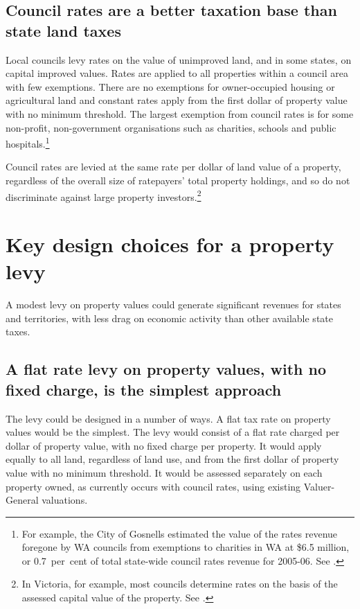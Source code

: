 \documentclass[twoside,english]{palatinob5portrait}
\begin{document}
\section{\label{sec:PROP-5-2}Council rates are a better taxation base than state land taxes}
Local councils levy rates on the value of unimproved land, and in some states, on capital improved values. Rates are applied to all properties within a council area with few exemptions. There are no exemptions for owner-occupied housing or agricultural land and constant rates apply from the first dollar of property value with no minimum threshold. The largest exemption from council rates is for some non-profit, non-government organisations such as charities, schools and public hospitals.\footnote{For example, the City of Gosnells estimated the value of the rates revenue foregone by WA councils from exemptions to charities in WA at \$6.5 million, or 0.7~per~cent of total state-wide council rates revenue for 2005-06. See \textcite[][107]{productivity2008assessing}.}

Council rates are levied at the same rate per dollar of land value of a property, regardless of the overall size of ratepayers’ total property holdings, and so do not discriminate against large property investors.\footnote{In Victoria, for example, most councils determine rates on the basis of the assessed capital value of the property. See \textcite[][154]{HefferanBoyd2010}.}  

\chapter{Key design choices for a property levy}
A modest levy on property values could generate significant revenues for states and territories, with less drag on economic activity than other available state taxes.

\section{A flat rate levy on property values, with no fixed charge, is the simplest approach\label{sec:PROP-6-1}}
The levy could be designed in a number of ways. A flat tax rate on property values would be the simplest. The levy would consist of a flat rate charged per dollar of property value, with no fixed charge per property. It would apply equally to all land, regardless of land use, and from the first dollar of property value with no minimum threshold. It would be assessed separately on each property owned, as currently occurs with council rates, using existing Valuer-General valuations. 
\end{document}
